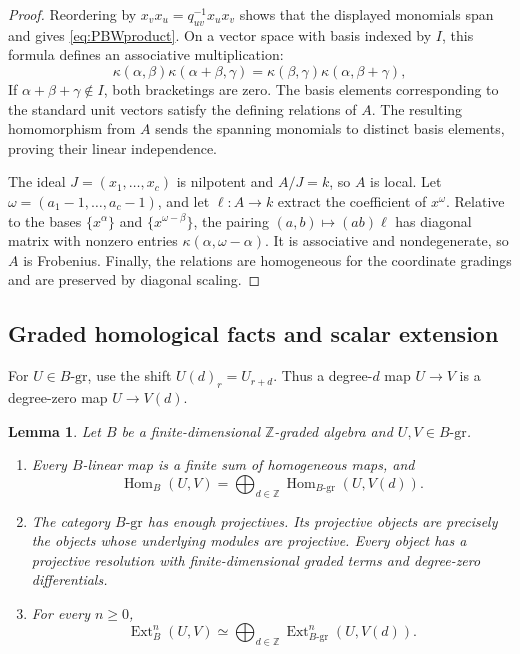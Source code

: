 \documentclass[10pt,a4paper]{amsart}
\numberwithin{equation}{section}
\newtheorem{lemma}[definition]{Lemma}
\DeclareMathOperator{\Ext}{Ext}
\DeclareMathOperator{\Hom}{Hom}
\newcommand{\Z}{\mathbb Z}
\newcommand{\gmod}[1]{#1\text{-}\mathrm{gr}}
\begin{document}
\begin{proof}
Reordering by \(x_vx_u=q_{uv}^{-1}x_ux_v\) shows that the displayed
monomials span and gives \eqref{eq:PBWproduct}. On a vector space with
basis indexed by \(I\), this formula defines an associative multiplication:
\[
 \kappa(\alpha,\beta)\kappa(\alpha+\beta,\gamma)
 =\kappa(\beta,\gamma)\kappa(\alpha,\beta+\gamma),
\]
If \(\alpha+\beta+\gamma\notin I\), both bracketings are zero.
The basis elements corresponding to the standard unit vectors
satisfy the defining relations of \(A\).
The resulting homomorphism from \(A\) sends the spanning monomials
to distinct basis elements, proving their linear independence.

The ideal \(J=(x_1,\ldots,x_c)\) is nilpotent and \(A/J=k\), so \(A\)
is local. Let \(\omega=(a_1-1,\ldots,a_c-1)\), and let \(\ell:A\to k\)
extract the coefficient of \(x^\omega\). Relative to the bases
\(\{x^\alpha\}\) and \(\{x^{\omega-\beta}\}\), the pairing
\((a,b)\mapsto(ab)\ell\) has diagonal matrix with nonzero entries
\(\kappa(\alpha,\omega-\alpha)\). It is associative and nondegenerate,
so \(A\) is Frobenius. Finally, the relations are homogeneous for the
coordinate gradings and are preserved by diagonal scaling.
\end{proof}

\subsection{Graded homological facts and scalar extension}

For \(U\in\gmod{B}\), use the shift \(U(d)_r=U_{r+d}\).
Thus a degree-\(d\) map \(U\to V\) is a degree-zero map \(U\to V(d)\).

\begin{lemma}\label{lem:graded-facts}
Let \(B\) be a finite-dimensional \(\Z\)-graded algebra and
\(U,V\in\gmod{B}\).
\begin{enumerate}
\item Every \(B\)-linear map is a finite sum of homogeneous maps, and
\[
 \Hom_B(U,V)=\bigoplus_{d\in\Z}\Hom_{\gmod{B}}(U,V(d)).
\]
\item The category \(\gmod{B}\) has enough projectives. Its projective
objects are precisely the objects whose underlying modules are
projective. Every object has a projective resolution with
finite-dimensional graded terms and degree-zero differentials.
\item For every \(n\geq0\),
\begin{equation}\label{eq:Ext-decomp}
 \Ext_B^n(U,V)\simeq
 \bigoplus_{d\in\Z}\Ext_{\gmod{B}}^n(U,V(d)).
\end{equation}
\end{enumerate}
\end{lemma}
\end{document}
